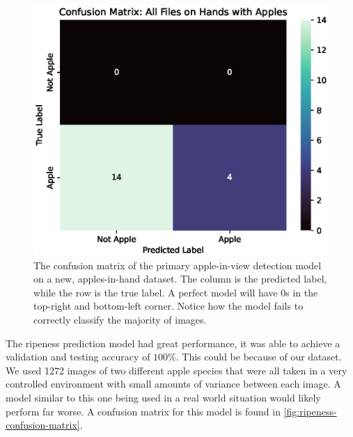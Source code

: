 \begin{figure}[htb]
    \centering
    \includegraphics[width=\columnwidth,keepaspectratio]
    {./figures/confusion_matrix_All_Files_on_Hands_with_Apples}
    \caption{
        The confusion matrix of the primary apple-in-view detection model on a new,
        apples-in-hand dataset.
        The column is the predicted label, while the row is the true label.
        A perfect model will have 0s in the top-right and bottom-left corner.
        Notice how the model fails to correctly classify the majority of images.
    }
    \label{fig:apple-in-hand-confusion-matrix}
\end{figure}

The ripeness prediction model had great performance, it was able to achieve a
validation and testing accuracy of $100\%$.
This could be because of our dataset.
We used 1272 images of two different apple species that were all taken in a very
controlled environment with small amounts of variance between each image.
A model similar to this one being used in a real world situation would likely perform
far worse.
A confusion matrix for this model is found in \autoref{fig:ripeness-confusion-matrix}.

